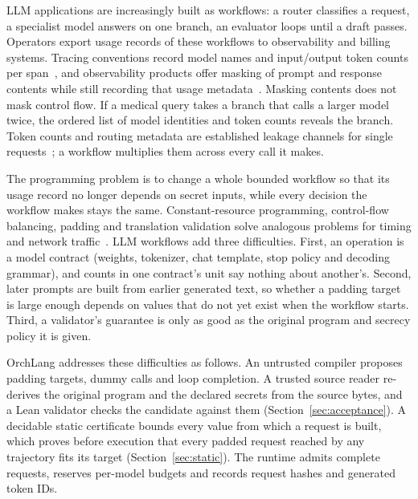 \documentclass[preprint,12pt]{elsarticle}
\theoremstyle{definition}
\begin{document}
LLM applications are increasingly built as workflows: a router classifies a
request, a specialist model answers on one branch, an evaluator loops until a
draft passes. Operators export usage records of these workflows to observability
and billing systems. Tracing conventions record model names and input/output
token counts per span~\cite{otel2026genai}, and observability products offer
masking of prompt and response contents while still recording that usage
metadata~\cite{langsmith2026mask,langfuse2026mask,helicone2026omit}. Masking
contents does not mask control flow. If a medical query takes a branch that calls
a larger model twice, the ordered list of model identities and token counts
reveals the branch. Token counts and routing metadata are established leakage
channels for single requests~\cite{weiss2024prompt,zhang2024timewilltell,chen2026routing};
a workflow multiplies them across every call it makes.

The programming problem is to change a whole bounded workflow so that its usage
record no longer depends on secret inputs, while every decision the workflow
makes stays the same. Constant-resource programming, control-flow balancing,
padding and translation validation solve analogous problems for timing and network
traffic~\cite{agat2000transforming,ngo2017constant,wang2014supersequence,pnueli1998tv}.
LLM workflows add three difficulties. First, an operation is a model contract
(weights, tokenizer, chat template, stop policy and decoding grammar), and counts in
one contract's unit say nothing about another's. Second, later prompts are built
from earlier generated text, so whether a padding target is large enough depends
on values that do not yet exist when the workflow starts. Third, a validator's
guarantee is only as good as the original program and secrecy policy it is given.

OrchLang addresses these difficulties as follows. An untrusted compiler proposes
padding targets, dummy calls and loop completion. A trusted source reader
re-derives the original program and the declared secrets from the source bytes,
and a Lean validator checks the candidate against them
(Section~\ref{sec:acceptance}). A decidable static certificate bounds every value
from which a request is built, which proves before execution that every padded
request reached by any trajectory fits its target (Section~\ref{sec:static}). The
runtime admits complete requests, reserves per-model budgets and records request
hashes and generated token IDs.
\end{document}
